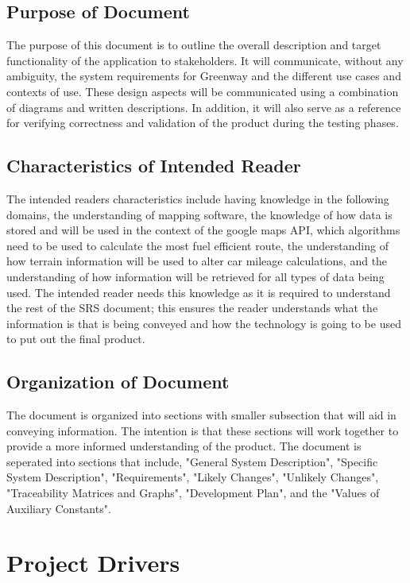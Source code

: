 \documentclass[12pt]{article}
\begin{document}
\subsection{Purpose of Document}

The purpose of this document is to outline the overall description and target functionality
of the application to stakeholders. It will communicate, without any ambiguity, the system
requirements for Greenway and the different use cases and contexts of use. These design
aspects will be communicated using a combination of diagrams and written descriptions.
In addition, it will also serve as a reference for verifying correctness and validation of the
product during the testing phases.


\subsection{Characteristics of Intended Reader} \label{sec_IntendedReader}

The intended readers characteristics include having knowledge in the following domains, 
the understanding of mapping software, the knowledge of how data is stored and will be used
in the context of the google maps API, which algorithms need to be used to calculate the most
fuel efficient route, the understanding of how terrain information will be used to alter car mileage
calculations, and the understanding of how information will be retrieved for all types of data being used.
The intended reader needs this knowledge as it is required to understand the rest of the SRS document;
this ensures the reader understands what the information is that is being conveyed and how the technology
is going to be used to put out the final product.

\subsection{Organization of Document}

The document is organized into sections with smaller subsection that will aid in conveying information.
The intention is that these sections will work together to provide a more informed understanding of the product.
The document is seperated into sections that include, "General System Description", "Specific System Description", "Requirements",
"Likely Changes", "Unlikely Changes", "Traceability Matrices and Graphs", "Development Plan", and the "Values of Auxiliary Constants".

\section{Project Drivers}
\end{document}
